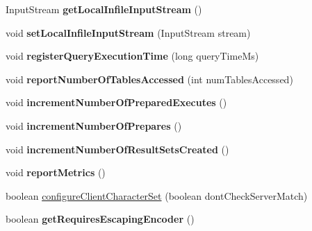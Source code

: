 \begin{DoxyCompactItemize}
Input\+Stream {\bfseries get\+Local\+Infile\+Input\+Stream} ()
\item 
\mbox{\label{classcom_1_1mysql_1_1cj_1_1_native_session_ac7ccf772bceca1b9c12a073619520b8e}} 
void {\bfseries set\+Local\+Infile\+Input\+Stream} (Input\+Stream stream)
\item 
\mbox{\label{classcom_1_1mysql_1_1cj_1_1_native_session_a26d00142698f2c53818c936aa4c31b74}} 
void {\bfseries register\+Query\+Execution\+Time} (long query\+Time\+Ms)
\item 
\mbox{\label{classcom_1_1mysql_1_1cj_1_1_native_session_a64d119e0ec21d5146318d90f9da8e1b5}} 
void {\bfseries report\+Number\+Of\+Tables\+Accessed} (int num\+Tables\+Accessed)
\item 
\mbox{\label{classcom_1_1mysql_1_1cj_1_1_native_session_ac006a8d0bf0acab736f072395051c611}} 
void {\bfseries increment\+Number\+Of\+Prepared\+Executes} ()
\item 
\mbox{\label{classcom_1_1mysql_1_1cj_1_1_native_session_a7fab2f90790ac45fb124763817343f07}} 
void {\bfseries increment\+Number\+Of\+Prepares} ()
\item 
\mbox{\label{classcom_1_1mysql_1_1cj_1_1_native_session_a3f78cb07289164ae9c99faa73fd6ff77}} 
void {\bfseries increment\+Number\+Of\+Result\+Sets\+Created} ()
\item 
\mbox{\label{classcom_1_1mysql_1_1cj_1_1_native_session_aed85a5a9a7dd415b1f63e010c2a54d33}} 
void {\bfseries report\+Metrics} ()
\item 
boolean \mbox{\hyperlink{classcom_1_1mysql_1_1cj_1_1_native_session_abf5696ade184fb2908093b85c3b644be}{configure\+Client\+Character\+Set}} (boolean dont\+Check\+Server\+Match)
\item 
\mbox{\label{classcom_1_1mysql_1_1cj_1_1_native_session_a94f1148508cff92c1ae9a20234990b5a}} 
boolean {\bfseries get\+Requires\+Escaping\+Encoder} ()

\end{DoxyCompactItemize}
